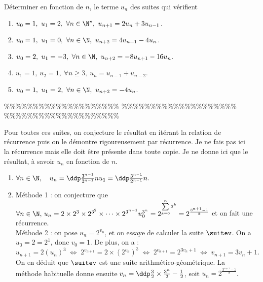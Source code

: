 



\begin{exercice} \;
D\'eterminer en fonction de $n$, le terme $u_n$ des suites qui v\'erifient
\begin{enumerate}
 \item 
$u_0=1,\ u_1=2,\ \forall n\in\N^{\star},\ u_{n+1}=2u_n+3u_{n-1}$.
\item 
$u_0=1,\ u_1=0,\ \forall n\in\N,\ u_{n+2}=4u_{n+1}-4u_{n}$.
\item 
$u_0=2,\ u_1=-3,\ \forall n\in\N,\ u_{n+2}=-8u_{n+1}-16u_{n}$.
\item 
$u_1=1,\ u_2=1,\ \forall n\geq 3,\ u_{n}=u_{n-1}+u_{n-2}$.
\item 
$u_0=1,\ u_1=2,\ \forall n\in\N,\ u_{n+2}=-4u_{n}$.
\end{enumerate}
\end{exercice}


\%\%\%\%\%\%\%\%\%\%\%\%\%\%\%\%\%\%\%\%
\%\%\%\%\%\%\%\%\%\%\%\%\%\%\%\%\%\%\%\%
\%\%\%\%\%\%\%\%\%\%\%\%\%\%\%\%\%\%\%\%




\begin{correction} \;
Pour toutes ces suites, on conjecture le r\'esultat en it\'erant la relation de r\'ecurrence puis on le d\'emontre rigoureusement par r\'ecurrence. Je ne fais pas ici la r\'ecurrence mais elle doit \^etre pr\'esente dans toute copie. Je ne donne ici que le r\'esultat, \`a savoir $u_n$ en fonction de $n$.
\begin{enumerate}
\item $\forall n\in\N,\quad u_n=\ddp\frac{3^{n-1}}{2^{n-1}}nu_1=\ddp\frac{3^{n-1} }{2^{n-1}}n.$
\item M\'ethode 1 : on conjecture que $\forall n\in\N,\,u_n=2\times 2^3\times 2^{3^2}\times\dots\times 2^{3^{n-1}} u_0^{3^n}=2^{\sum\limits_{k=0}^{n} 3^k } = 2^{\frac{3^{n+1}-1}{2}}$ et on fait une r\'ecurrence.\\
M\'ethode 2 : on pose $u_n = 2^{v_n}$, et on essaye de calculer la suite $\suitev$. On a $u_0=2=2^1$, donc $v_0=1$. De plus, on a :
$$u_{n+1} =2(u_n)^3 \; \Leftrightarrow \;  2^{v_{n+1}} =  2\times (2^{v_n})^3 \; \Leftrightarrow \; 2^{v_{n+1}} =  2^{3v_n+1} \; \Leftrightarrow \; v_{n+1} = 3v_{n}+1.$$
On en d\'eduit que $\suitev$ est une suite arithm\'etico-g\'eom\'etrique. La m\'ethode habituelle donne ensuite $v_n=\ddp\frac{3}{2}\times\frac{3^{n}}{2}-\frac{1}{2}$, soit $u_n= 2^{\frac{3^{n+1}-1}{2}}$.
\end{enumerate}
\end{correction}